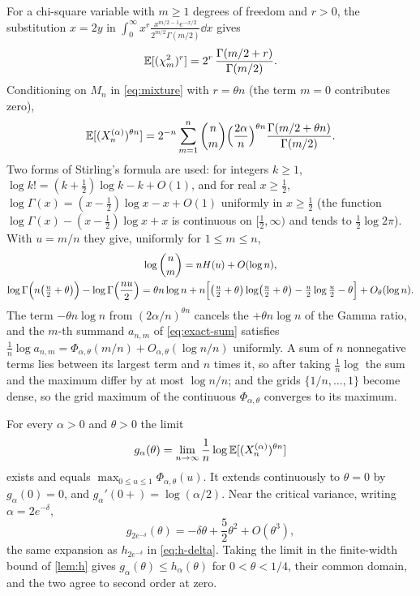 For a chi-square variable with $m\ge1$ degrees of freedom and $r>0$, the substitution $x=2y$ in $\int_0^\infty x^r\frac{x^{m/2-1}e^{-x/2}}{2^{m/2}\Gamma(m/2)}\dd x$ gives
\begin{equation}\label{eq:chi-moment}
\mathbb{E}[(\chi^2_m)^r]=2^r\,\frac{\Gamma(m/2+r)}{\Gamma(m/2)} .
\end{equation}
Conditioning on $M_n$ in \cref{eq:mixture} with $r=\theta n$ (the term $m=0$ contributes zero),
\begin{equation}\label{eq:exact-sum}
\mathbb{E}[(X_n^{(\alpha)})^{\theta n}]=2^{-n}\sum_{m=1}^n\binom nm\Bigl(\frac{2\alpha}n\Bigr)^{\theta n}\frac{\Gamma(m/2+\theta n)}{\Gamma(m/2)} .
\end{equation}
Two forms of Stirling's formula are used: for integers $k\ge1$, $\log k!=(k+\tfrac12)\log k-k+O(1)$, and for real $x\ge\tfrac12$, $\log\Gamma(x)=(x-\tfrac12)\log x-x+O(1)$ uniformly in $x\ge\tfrac12$ (the function $\log\Gamma(x)-(x-\tfrac12)\log x+x$ is continuous on $[\tfrac12,\infty)$ and tends to $\tfrac12\log2\pi$). With $u=m/n$ they give, uniformly for $1\le m\le n$,
\begin{gather*}
\log\binom nm=nH(u)+O(\log n),\\
\log\Gamma\Bigl(n\bigl(\tfrac u2+\theta\bigr)\Bigr)-\log\Gamma\Bigl(\frac{nu}2\Bigr)=\theta n\log n+n\Bigl[\bigl(\tfrac u2+\theta\bigr)\log\bigl(\tfrac u2+\theta\bigr)-\tfrac u2\log\tfrac u2-\theta\Bigr]+O_\theta(\log n).
\end{gather*}
The term $-\theta n\log n$ from $(2\alpha/n)^{\theta n}$ cancels the $+\theta n\log n$ of the Gamma ratio, and the $m$-th summand $a_{n,m}$ of \cref{eq:exact-sum} satisfies $\frac1n\log a_{n,m}=\Phi_{\alpha,\theta}(m/n)+O_{\alpha,\theta}(\log n/n)$ uniformly. A sum of $n$ nonnegative terms lies between its largest term and $n$ times it, so after taking $\frac1n\log$ the sum and the maximum differ by at most $\log n/n$; and the grids $\{1/n,\dots,1\}$ become dense, so the grid maximum of the continuous $\Phi_{\alpha,\theta}$ converges to its maximum.

\begin{proposition}\label{prop:exact}
For every $\alpha>0$ and $\theta>0$ the limit
\[
g_\alpha(\theta)=\lim_{n\to\infty}\frac1n\log\mathbb{E}[(X_n^{(\alpha)})^{\theta n}]
\]
exists and equals $\max_{0\le u\le1}\Phi_{\alpha,\theta}(u)$. It extends continuously to $\theta=0$ by $g_\alpha(0)=0$, and $g_\alpha'(0+)=\log(\alpha/2)$. Near the critical variance, writing $\alpha=2e^{-\delta}$,
\begin{equation}\label{eq:g-expansion}
g_{2e^{-\delta}}(\theta)=-\delta\theta+\frac52\theta^2+O(\theta^3),
\end{equation}
the same expansion as $h_{2e^{-\delta}}$ in \cref{eq:h-delta}. Taking the limit in the finite-width bound of \cref{lem:h} gives $g_\alpha(\theta)\le h_\alpha(\theta)$ for $0<\theta<1/4$, their common domain, and the two agree to second order at zero.
\end{proposition}

